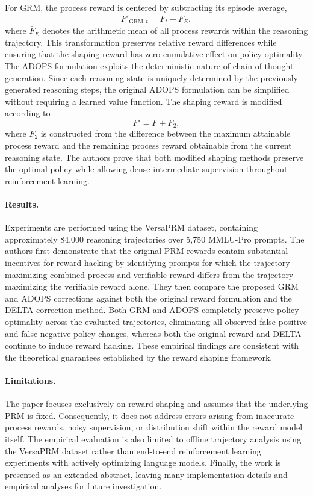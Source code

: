 \documentclass[11pt]{article}
\begin{document}
For GRM, the process reward is centered by subtracting its episode average,
\[
F'_{\mathrm{GRM},t}
=
F_t
-
\bar{F}_E,
\]
where \(\bar{F}_E\) denotes the arithmetic mean of all process rewards within the reasoning trajectory. This transformation preserves relative reward differences while ensuring that the shaping reward has zero cumulative effect on policy optimality.
The ADOPS formulation exploits the deterministic nature of chain-of-thought generation. Since each reasoning state is uniquely determined by the previously generated reasoning steps, the original ADOPS formulation can be simplified without requiring a learned value function. The shaping reward is modified according to
\[
F'
=
F
+
F_2,
\]
where \(F_2\) is constructed from the difference between the maximum attainable process reward and the remaining process reward obtainable from the current reasoning state. The authors prove that both modified shaping methods preserve the optimal policy while allowing dense intermediate supervision throughout reinforcement learning. 

\paragraph{Results.}
Experiments are performed using the VersaPRM dataset, containing approximately 84,000 reasoning trajectories over 5,750 MMLU-Pro prompts. The authors first demonstrate that the original PRM rewards contain substantial incentives for reward hacking by identifying prompts for which the trajectory maximizing combined process and verifiable reward differs from the trajectory maximizing the verifiable reward alone. They then compare the proposed GRM and ADOPS corrections against both the original reward formulation and the DELTA correction method. Both GRM and ADOPS completely preserve policy optimality across the evaluated trajectories, eliminating all observed false-positive and false-negative policy changes, whereas both the original reward and DELTA continue to induce reward hacking. These empirical findings are consistent with the theoretical guarantees established by the reward shaping framework. 

\paragraph{Limitations.}
The paper focuses exclusively on reward shaping and assumes that the underlying PRM is fixed. Consequently, it does not address errors arising from inaccurate process rewards, noisy supervision, or distribution shift within the reward model itself. The empirical evaluation is also limited to offline trajectory analysis using the VersaPRM dataset rather than end-to-end reinforcement learning experiments with actively optimizing language models. Finally, the work is presented as an extended abstract, leaving many implementation details and empirical analyses for future investigation. 
\end{document}
